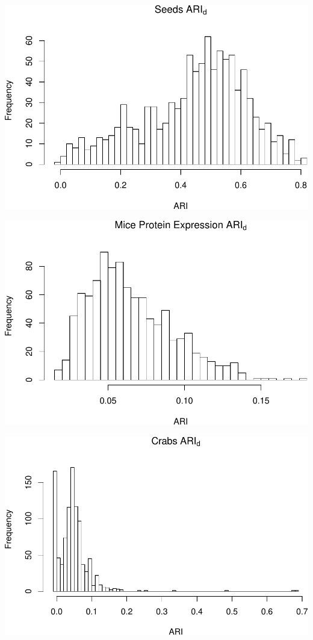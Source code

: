 \begin{center}\includegraphics[width=1\linewidth]{Report_files/figure-latex/unnamed-chunk-15-5} \end{center}

\begin{center}\includegraphics[width=1\linewidth]{Report_files/figure-latex/unnamed-chunk-15-6} \end{center}

\begin{center}\includegraphics[width=1\linewidth]{Report_files/figure-latex/unnamed-chunk-15-7} \end{center}


